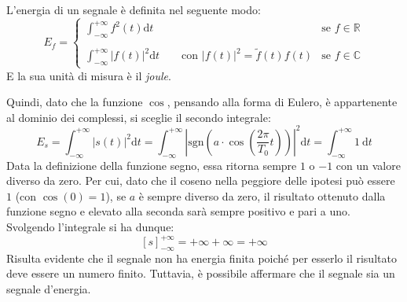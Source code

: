 \documentclass[a4paper]{article}
\begin{document}
	\noindent
	L'energia di un segnale è definita nel seguente modo:
	\begin{equation*}
		E_{f} = \begin{cases}
			\displaystyle\int_{-\infty}^{+\infty} f^{2}\left(t\right) \mathrm{d}t & \text{se }f \in \mathbb{R} \\
			\\
			\displaystyle\int_{-\infty}^{+\infty} \left|f\left(t\right)\right|^{2} \mathrm{d}t \hspace{2em} \text{con } \left|f\left(t\right)\right|^{2} = \tilde{f}\left(t\right)f\left(t\right) & \text{se }f \in \mathbb{C}
		\end{cases}
	\end{equation*}
	E la sua unità di misura è il \emph{joule}.\newpage

	\noindent
	Quindi, dato che la funzione $\cos$, pensando alla forma di Eulero, è appartenente al dominio dei complessi, si sceglie il secondo integrale:
	\begin{equation*}
		E_{s} = \displaystyle\int_{-\infty}^{+\infty} \left|s\left(t\right)\right|^{2} \mathrm{d}t =
		\displaystyle\int_{-\infty}^{+\infty} \left| \mathrm{sgn}\left(a \cdot \cos\left(\dfrac{2\pi}{T_{0}}t\right)\right) \right|^{2} \mathrm{d}t =
		\displaystyle\int_{-\infty}^{+\infty} 1 \:\mathrm{d}t
	\end{equation*}
	Data la definizione della funzione segno, essa ritorna sempre $1$ o $-1$ con un valore diverso da zero. Per cui, dato che il coseno nella peggiore delle ipotesi può essere $1$ (con $\cos\left(0\right) = 1$), se $a$ è sempre diverso da zero, il risultato ottenuto dalla funzione segno e elevato alla seconda sarà sempre positivo e pari a uno. Svolgendo l'integrale si ha dunque:
	\begin{equation*}
		\left[s\right]_{-\infty}^{+\infty} = +\infty+\infty = +\infty
	\end{equation*}
	Risulta evidente che il segnale non ha energia finita poiché per esserlo il risultato deve essere un numero finito. Tuttavia, è possibile affermare che il segnale sia un segnale d'energia.\newline
	
\end{document}
